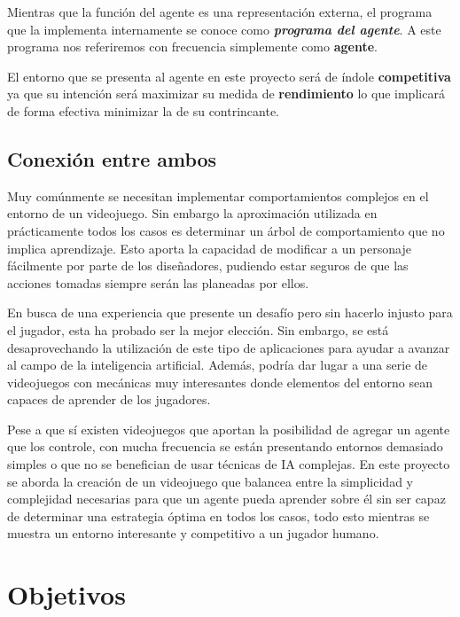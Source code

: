 \bigskip

Mientras que la función del agente es una representación externa, el programa que la implementa internamente se conoce como \textbf{\textit{programa del agente}}. A este programa nos referiremos con frecuencia simplemente como \textbf{agente}.

\bigskip

El entorno que se presenta al agente en este proyecto será de índole \textbf{competitiva} ya que su intención será maximizar su medida de \textbf{rendimiento} lo que implicará de forma efectiva minimizar la de su contrincante.

\subsection{Conexión entre ambos}

Muy comúnmente se necesitan implementar comportamientos complejos en el entorno de un videojuego. Sin embargo la aproximación utilizada en prácticamente todos los casos es determinar un árbol de comportamiento que no implica aprendizaje. Esto aporta la capacidad de modificar a un personaje fácilmente por parte de los diseñadores, pudiendo estar seguros de que las acciones tomadas siempre serán las planeadas por ellos. 

\bigskip

En busca de una experiencia que presente un desafío pero sin hacerlo injusto para el jugador, esta ha probado ser la mejor elección. Sin embargo, se está desaprovechando la utilización de este tipo de aplicaciones para ayudar a avanzar al campo de la inteligencia artificial. Además, podría dar lugar a una serie de videojuegos con mecánicas muy interesantes donde elementos del entorno sean capaces de aprender de los jugadores.

\bigskip

Pese a que sí existen videojuegos que aportan la posibilidad de agregar un agente que los controle, con mucha frecuencia se están presentando entornos demasiado simples o que no se benefician de usar técnicas de IA complejas. En este proyecto se aborda la creación de un videojuego que balancea entre la simplicidad y complejidad necesarias para que un agente pueda aprender sobre él sin ser capaz de determinar una estrategia óptima en todos los casos, todo esto mientras se muestra un entorno interesante y competitivo a un jugador humano.



\section{Objetivos}

